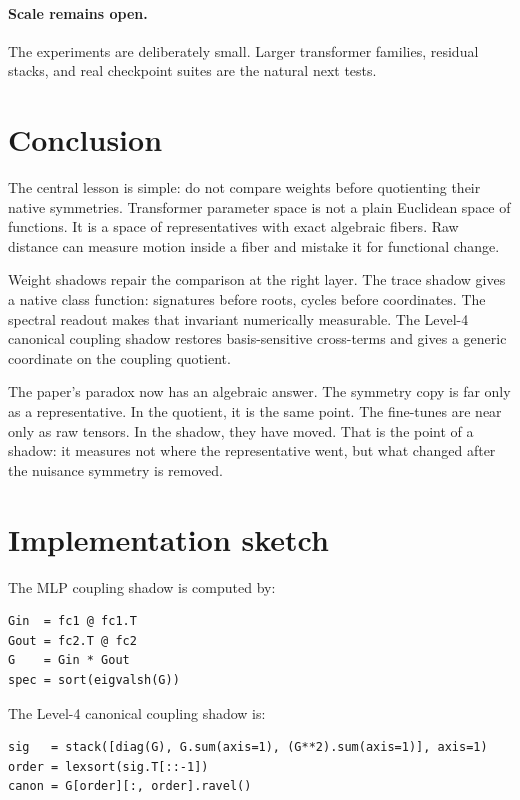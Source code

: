 \documentclass[11pt]{article}
\begin{document}
\paragraph{Scale remains open.} The experiments are deliberately small. Larger transformer families, residual stacks, and real checkpoint suites are the natural next tests.

\section{Conclusion}

The central lesson is simple: do not compare weights before quotienting their native symmetries. Transformer parameter space is not a plain Euclidean space of functions. It is a space of representatives with exact algebraic fibers. Raw distance can measure motion inside a fiber and mistake it for functional change.

Weight shadows repair the comparison at the right layer. The trace shadow gives a native class function: signatures before roots, cycles before coordinates. The spectral readout makes that invariant numerically measurable. The Level-4 canonical coupling shadow restores basis-sensitive cross-terms and gives a generic coordinate on the coupling quotient.

The paper's paradox now has an algebraic answer. The symmetry copy is far only as a representative. In the quotient, it is the same point. The fine-tunes are near only as raw tensors. In the shadow, they have moved. That is the point of a shadow: it measures not where the representative went, but what changed after the nuisance symmetry is removed.

\appendix

\section{Implementation sketch}

The MLP coupling shadow is computed by:
\begin{verbatim}
Gin  = fc1 @ fc1.T
Gout = fc2.T @ fc2
G    = Gin * Gout
spec = sort(eigvalsh(G))
\end{verbatim}

The Level-4 canonical coupling shadow is:
\begin{verbatim}
sig   = stack([diag(G), G.sum(axis=1), (G**2).sum(axis=1)], axis=1)
order = lexsort(sig.T[::-1])
canon = G[order][:, order].ravel()
\end{verbatim}
\end{document}
